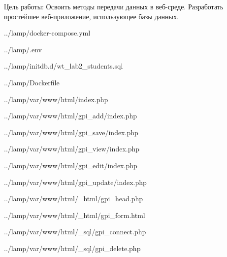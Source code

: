Цель работы:
Освоить методы передачи данных в веб-среде.
Разработать простейшее веб-приложение, использующее базы данных.


{../lamp/docker-compose.yml}


{../lamp/.env}


{../lamp/initdb.d/wt_lab2_students.sql}


{../lamp/Dockerfile}


{../lamp/var/www/html/index.php}


{../lamp/var/www/html/gpi_add/index.php}


{../lamp/var/www/html/gpi_save/index.php}


{../lamp/var/www/html/gpi_view/index.php}


{../lamp/var/www/html/gpi_edit/index.php}


{../lamp/var/www/html/gpi_update/index.php}


{../lamp/var/www/html/_html/gpi_head.php}


{../lamp/var/www/html/_html/gpi_form.html}


{../lamp/var/www/html/_sql/gpi_connect.php}


{../lamp/var/www/html/_sql/gpi_delete.php}
